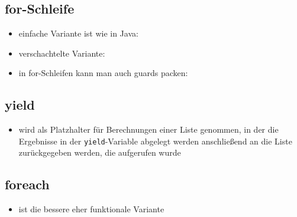 \subsection{for-Schleife}
\begin{itemize}
  \item einfache Variante ist wie in Java:
  
  
  
  \item verschachtelte Variante:
  
  
  
  \item in for-Schleifen kann man auch guards packen:
  
  
\end{itemize}


\subsection{yield}
\begin{itemize}
  \item wird als Platzhalter für Berechnungen einer Liste genommen, in der
  die Ergebnisse in der \texttt{yield}-Variable abgelegt werden \und anschließend
  an die Liste zurückgegeben werden, die aufgerufen wurde
  
  
 
\end{itemize}


\subsection{foreach}
\begin{itemize}
  \item ist die bessere \und eher funktionale Variante 
  
  
\end{itemize}


